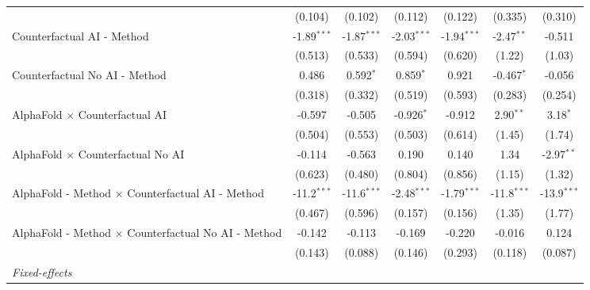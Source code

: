 \begin{tabular}{lcccccc}
                                                              & (0.104)       & (0.102)       & (0.112)       & (0.122)       & (0.335)       & (0.310)\\   
   Counterfactual AI - Method                                 & -1.89$^{***}$ & -1.87$^{***}$ & -2.03$^{***}$ & -1.94$^{***}$ & -2.47$^{**}$  & -0.511\\   
                                                              & (0.513)       & (0.533)       & (0.594)       & (0.620)       & (1.22)        & (1.03)\\   
   Counterfactual No AI - Method                              & 0.486         & 0.592$^{*}$   & 0.859$^{*}$   & 0.921         & -0.467$^{*}$  & -0.056\\   
                                                              & (0.318)       & (0.332)       & (0.519)       & (0.593)       & (0.283)       & (0.254)\\   
   AlphaFold $\times$ Counterfactual AI                       & -0.597        & -0.505        & -0.926$^{*}$  & -0.912        & 2.90$^{**}$   & 3.18$^{*}$\\   
                                                              & (0.504)       & (0.553)       & (0.503)       & (0.614)       & (1.45)        & (1.74)\\   
   AlphaFold $\times$ Counterfactual No AI                    & -0.114        & -0.563        & 0.190         & 0.140         & 1.34          & -2.97$^{**}$\\   
                                                              & (0.623)       & (0.480)       & (0.804)       & (0.856)       & (1.15)        & (1.32)\\   
   AlphaFold - Method $\times$ Counterfactual AI - Method     & -11.2$^{***}$ & -11.6$^{***}$ & -2.48$^{***}$ & -1.79$^{***}$ & -11.8$^{***}$ & -13.9$^{***}$\\   
                                                              & (0.467)       & (0.596)       & (0.157)       & (0.156)       & (1.35)        & (1.77)\\   
   AlphaFold - Method $\times$ Counterfactual No AI - Method  & -0.142        & -0.113        & -0.169        & -0.220        & -0.016        & 0.124\\   
                                                              & (0.143)       & (0.088)       & (0.146)       & (0.293)       & (0.118)       & (0.087)\\   
   \midrule
   \emph{Fixed-effects}\\

\end{tabular}
